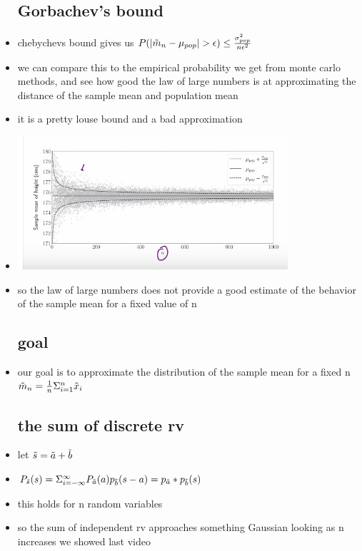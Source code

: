 \documentclass{article}
\begin{document}
\begin{itemize}
\subsection{Gorbachev's bound}
\item chebychevs bound gives us $P(|\Tilde{m}_{n}-\mu_{pop}|>\epsilon)\leq \frac{\sigma^2_{pop}}{n\epsilon^2}$ 
\item we can compare this to the empirical probability we get from monte carlo methods, and see how good the law of large numbers is at approximating the distance of the sample mean and population mean 
\item it is a pretty louse bound and a bad approximation 
\item \includegraphics[width=10cm]{notes/week_3/Video 2: the standard error/immages/v_2_1.jpg}
\item so the law of large numbers does not provide a good estimate of the behavior of the sample mean for a fixed value of n 
\subsection{goal}
\item our goal is to approximate the distribution of the sample mean for a fixed n $\Tilde{m}_{n}=\frac{1}{n}\Sigma_{i=1}^{n}\Tilde{x}_i$
\subsection{the sum of discrete rv}
\item let $\Tilde{s}=\Tilde{a}+\Tilde{b}$
\item $P_{\Tilde{s}}(s)=\Sigma_{i=-\infty}^{\infty}P_{\Tilde{a}}(a)p_{\Tilde{b}}(s-a)=p_{\Tilde{a}}*p_{\Tilde{b}}(s)$
\item this holds for n random variables
\item so the sum of independent rv approaches something Gaussian looking as n increases we showed last video 

\end{itemize}
\end{document}
